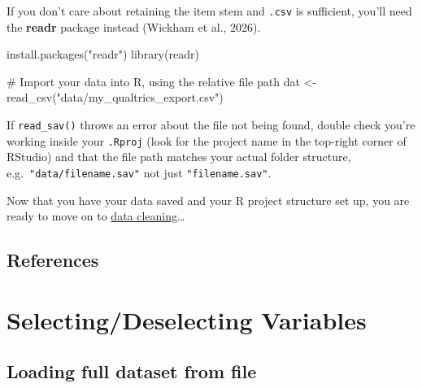 \documentclass[
  letterpaper,
  DIV=11,
  numbers=noendperiod]{scrreprt}
\newenvironment{Shaded}{\begin{snugshade}}{\end{snugshade}}
\newcommand{\CommentTok}[1]{\textcolor[rgb]{0.37,0.37,0.37}{#1}}
\newcommand{\FunctionTok}[1]{\textcolor[rgb]{0.28,0.35,0.67}{#1}}
\newcommand{\NormalTok}[1]{\textcolor[rgb]{0.00,0.23,0.31}{#1}}
\newcommand{\OtherTok}[1]{\textcolor[rgb]{0.00,0.23,0.31}{#1}}
\newcommand{\StringTok}[1]{\textcolor[rgb]{0.13,0.47,0.30}{#1}}
\begin{document}
If you don't care about retaining the item stem and \texttt{.csv} is
sufficient, you'll need the \textbf{readr} package instead (Wickham et
al., 2026).

\begin{Shaded}
\begin{Highlighting}[]
\FunctionTok{install.packages}\NormalTok{(}\StringTok{"readr"}\NormalTok{)}
\FunctionTok{library}\NormalTok{(readr)}

\CommentTok{\# Import your data into R, using the relative file path}
\NormalTok{dat }\OtherTok{\textless{}{-}} \FunctionTok{read\_csv}\NormalTok{(}\StringTok{"data/my\_qualtrics\_export.csv"}\NormalTok{)}
\end{Highlighting}
\end{Shaded}

\begin{tcolorbox}[enhanced jigsaw, toprule=.15mm, coltitle=black, colframe=quarto-callout-warning-color-frame, colbacktitle=quarto-callout-warning-color!10!white, opacityback=0, left=2mm, breakable, rightrule=.15mm, bottomrule=.15mm, leftrule=.75mm, titlerule=0mm, arc=.35mm, opacitybacktitle=0.6, toptitle=1mm, bottomtitle=1mm, title=\textcolor{quarto-callout-warning-color}{\faExclamationTriangle}\hspace{0.5em}{Common error}, colback=white]

If \texttt{read\_sav()} throws an error about the file not being found,
double check you're working inside your \texttt{.Rproj} (look for the
project name in the top-right corner of RStudio) and that the file path
matches your actual folder structure, e.g.~\texttt{"data/filename.sav"}
not just \texttt{"filename.sav"}.

\end{tcolorbox}

Now that you have your data saved and your R project structure set up,
you are ready to move on to \href{data-cleaning.qmd}{data
cleaning}\ldots{}

\section{References}\label{references}

\chapter{Selecting/Deselecting
Variables}\label{selectingdeselecting-variables}

\section{Loading full dataset from
file}\label{loading-full-dataset-from-file}
\end{document}
